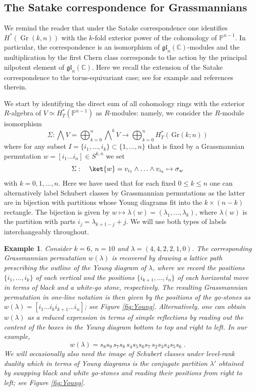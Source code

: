 \documentclass[12pt]{amsart}
\newcommand{\C}{\mathbb{C}}
\newcommand{\Gr}{\,\mathrm{Gr}}
\newcommand{\mb}[1]{\mathbb{#1}}
\newcommand{\op}[1]{\operatorname{#1}}
\newcommand{\ring}{R}
\newtheorem{example}[prop]{Example}
\numberwithin{equation}{section}
\numberwithin{figure}{section}
\newcommand{\gl}{\mathfrak{gl}}
\begin{document}
\subsection{The Satake correspondence for Grassmannians}
We remind the reader that under the Satake correspondence one identifies $H^*(\op{Gr}(k,n))$ with the $k$-fold exterior power of the cohomology of $\mb{P}^{n-1}$. In particular, the correspondence is an isomorphism of $\gl_n(\C)$-modules and the multiplication by the first Chern class corresponds to the action by the principal nilpotent element of $\gl_n(\C)$. Here we recall the extension of the Satake correspondence to the torus-equivariant case; see for example \cite{anderson2023equivariant,labelle2024equivariant} and references therein.

We start by identifying the direct sum of all cohomology rings with the exterior $\ring$-algebra of $V\simeq H^*_T(\mb{P}^{n-1})$ as $\ring$-modules: namely, we consider the $\ring$-module isomorphism
\begin{equation}\label{Satake_dom}
\Sigma:\bigwedge V=\bigoplus_{k=0}^n
\bigwedge\nolimits^kV\to \bigoplus_{k=0}^nH^*_T(\Gr(k;n))
\end{equation}
where for any subset $I=\{i_1,\ldots,i_k\}\subset\{1,\ldots,n\}$ that is fixed by a Grassmannian permutation $w=[i_1\ldots  i_n]\in S^{k,n}$ we set
    \begin{equation}\label{Satake}
    \Sigma:\quad \ket{w}=v_{i_1}\wedge\ldots\wedge v_{i_k}\mapsto \sigma_w
    \end{equation}
with $k=0,1,\ldots,n$. Here we have used that for each fixed $0\le k\le n$ one can alternatively label Schubert classes by Grassmannian permutations as the latter are in bijection with partitions whose Young diagrams fit into the $k\times(n-k)$ rectangle. The bijection is given by $w\mapsto\lambda(w)=(\lambda_1,\ldots,\lambda_k)$, where $\lambda(w)$ is the partition with parts $i_j=\lambda_{k+1-j} + j$. We will use both types of labels interchangeably throughout.

\begin{example}\rm
Consider $k=6$, $n=10$ and $\lambda=(4,4,2,2,1,0)$. The corresponding Grassmannian permutation $w(\lambda)$ is recovered by drawing a lattice path prescribing the outline of the Young diagram of $\lambda$, where we record the positions $\{i_1,\ldots,i_k\}$ of each vertical and the positions $\{i_{k+1},\ldots,i_n\}$ of each horizontal move in terms of black and a white-go stone, respectively. The resulting Grassmannian permutation in one-line notation is then given by the positions of the go-stones as $w(\lambda)=[i_1\ldots i_ki_{k+1} \ldots i_n]$; see Figure \ref{fig:Young}. Alternatively, one can obtain $w(\lambda)$ as a reduced expression in terms of simple reflections by reading out the content of the boxes in the Young diagram bottom to top and right to left. In our example,
\[
w(\lambda)=s_8s_9\,s_7s_8\,s_4s_5s_6s_7\,s_2s_3s_4s_5s_6\;.
\]
We will occasionally also need the image of Schubert classes under level-rank duality which in terms of Young diagrams is the conjugate partition $\lambda'$ obtained by swapping black and white go-stones and reading their positions from right to left; see Figure \ref{fig:Young}.
\end{example}
\end{document}
